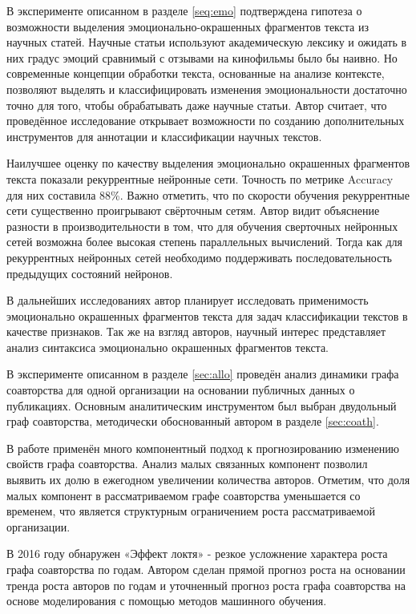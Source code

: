
В эксперименте описанном в разделе \ref{seq:emo} подтверждена гипотеза о возможности выделения эмоционально-окрашенных фрагментов текста из научных статей. Научные статьи используют академическую лексику и ожидать в них градус эмоций сравнимый с отзывами на кинофильмы было бы наивно. Но современные концепции обработки текста, основанные на анализе контексте, позволяют выделять и классифицировать изменения эмоциональности достаточно точно для того, чтобы обрабатывать даже научные статьи. Автор считает, что проведённое исследование открывает возможности по созданию дополнительных инструментов для аннотации и классификации научных текстов. 

Наилучшее оценку по качеству выделения эмоционально окрашенных фрагментов текста показали рекуррентные нейронные сети. Точность по метрике Accuracy для них составила 88\%. Важно отметить, что по скорости обучения рекуррентные сети существенно проигрывают свёрточным сетям. Автор видит объяснение разности в производительности в том, что для обучения сверточных нейронных сетей возможна более высокая степень параллельных вычислений. Тогда как для рекуррентных нейронных сетей необходимо поддерживать последовательность предыдущих состояний нейронов. 

В дальнейших исследованиях автор планирует исследовать применимость эмоционально окрашенных фрагментов текста для задач классификации текстов в качестве признаков. Так же на взгляд авторов, научный интерес представляет анализ синтаксиса эмоционально окрашенных фрагментов текста.


В эксперименте описанном в разделе \ref{sec:allo} проведён анализ динамики графа соавторства для одной организации на основании публичных данных о публикациях. Основным аналитическим инструментом был выбран двудольный граф соавторства, методически обоснованный автором в разделе \ref{sec:coath}. 

В работе применён много компонентный подход к прогнозированию изменению свойств графа соавторства. Анализ малых связанных компонент позволил выявить их долю в ежегодном увеличении количества авторов. Отметим, что доля малых компонент в рассматриваемом графе соавторства уменьшается со временем, что является структурным ограничением роста рассматриваемой организации.  

В 2016 году обнаружен «Эффект локтя» - резкое усложнение характера роста графа соавторства по годам.  
Автором сделан прямой прогноз роста на основании тренда роста авторов по годам и уточненный прогноз роста графа соавторства на основе моделирования с помощью методов машинного обучения. 


